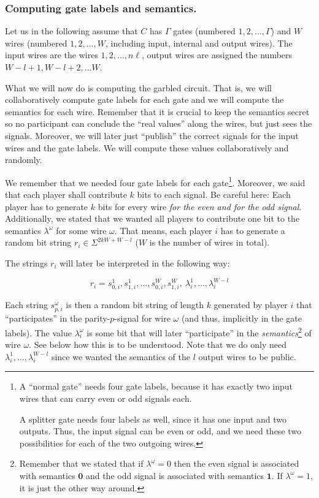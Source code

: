 \subsubsection{Computing gate labels and semantics.}
\label{sec:gate-labels-and-semantics-formal-def}

Let us in the following assume that $C$ has $\Gamma$ gates (numbered $1,2,\dots,\Gamma$) and $W$ wires (numbered $1,2,\dots,W$, including input, internal and output wires). The input wires are the wires $1,2,\dots,n\ell$, output wires are assigned the numbers $W-l+1,W-l+2,\dots W$.

What we will now do is computing the garbled circuit. That is, we will collaboratively compute gate labels for each gate and we will compute the semantics for each wire. Remember that it is crucial to keep the semantics secret so no participant can conclude the ``real values'' along the wires, but just sees the signals. Moreover, we will later just ``publish'' the correct signals for the input wires and the gate labels. We will compute these values collaboratively and randomly.

We remember that we needed four gate labels for each gate\footnote{A ``normal gate'' needs four gate labels, because it has exactly two input wires that can carry even or odd signals each. 

A splitter gate needs four labels as well, since it has one input and two outputs. Thus, the input signal can be even or odd, and we need these two possibilities for each of the two outgoing wires.}. Moreover, we said that each player shall contribute $k$ bits to each signal. Be careful here: Each player has to generate $k$ bits for every wire \emph{for the even and for the odd signal}. Additionally, we stated that we wanted all players to contribute one bit to the semantics $\lambda^\omega$ for some wire $\omega$. That means, each player $i$ has to generate a random bit string $r_i\in\Sigma^{2kW+W-l}$ ($W$ is the number of wires in total).

The strings $r_i$ will later be interpreted in the following way:

\begin{equation}
  \label{eq:interpretation-random-string-of-a-player}
  r_i=s_{0,i}^1,s_{1,i}^1,\dots,s_{0,i}^W,s_{1,i}^W,\  \lambda_i^1,\dots,\lambda_i^{W-l}
\end{equation}

Each string $s^\omega_{p,i}$ is then a random bit string of length $k$ generated by player $i$ that ``participates'' in the parity-$p$-signal for wire $\omega$ (and thus, implicitly in the gate labels). The value $\lambda_i^\omega$ is some bit that will later ``participate'' in the \emph{semantics}\footnote{Remember that we stated that if $\lambda^\omega=0$ then the even signal is associated with semantics $\mathbf{0}$ and the odd signal is associated with semantics $\mathbf{1}$. If $\lambda^\omega=1$, it is just the other way around.} of wire $\omega$. See below how this is to be understood. Note that we do only need $\lambda_i^1,\dots,\lambda_i^{W-l}$ since we wanted the semantics of the $l$ output wires to be public.

